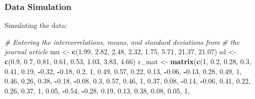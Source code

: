\documentclass[
  11pt,
]{book}
\newenvironment{Shaded}{\begin{snugshade}}{\end{snugshade}}
\newcommand{\CommentTok}[1]{\textcolor[rgb]{0.37,0.37,0.37}{\textit{#1}}}
\newcommand{\DecValTok}[1]{\textcolor[rgb]{0.06,0.06,0.06}{#1}}
\newcommand{\FloatTok}[1]{\textcolor[rgb]{0.06,0.06,0.06}{#1}}
\newcommand{\FunctionTok}[1]{\textcolor[rgb]{0.27,0.27,0.27}{\textbf{#1}}}
\newcommand{\NormalTok}[1]{#1}
\newcommand{\OtherTok}[1]{\textcolor[rgb]{0.37,0.37,0.37}{#1}}
\newcommand{\SpecialCharTok}[1]{\textcolor[rgb]{0.43,0.43,0.43}{\textbf{#1}}}
\begin{document}
\hypertarget{data-simulation-1}{%
\subsubsection{Data Simulation}\label{data-simulation-1}}

Simulating the data:

\begin{Shaded}
\begin{Highlighting}[]
\CommentTok{\# Entering the intercorrelations, means, and standard deviations from}
\CommentTok{\# the journal article}
\NormalTok{mu }\OtherTok{\textless{}{-}} \FunctionTok{c}\NormalTok{(}\FloatTok{1.99}\NormalTok{, }\FloatTok{2.82}\NormalTok{, }\FloatTok{2.48}\NormalTok{, }\FloatTok{2.32}\NormalTok{, }\FloatTok{1.75}\NormalTok{, }\FloatTok{5.71}\NormalTok{, }\FloatTok{21.37}\NormalTok{, }\FloatTok{21.07}\NormalTok{)}
\NormalTok{sd }\OtherTok{\textless{}{-}} \FunctionTok{c}\NormalTok{(}\FloatTok{0.9}\NormalTok{, }\FloatTok{0.7}\NormalTok{, }\FloatTok{0.81}\NormalTok{, }\FloatTok{0.61}\NormalTok{, }\FloatTok{0.53}\NormalTok{, }\FloatTok{1.03}\NormalTok{, }\FloatTok{3.83}\NormalTok{, }\FloatTok{4.66}\NormalTok{)}
\NormalTok{r\_mat }\OtherTok{\textless{}{-}} \FunctionTok{matrix}\NormalTok{(}\FunctionTok{c}\NormalTok{(}\DecValTok{1}\NormalTok{, }\FloatTok{0.2}\NormalTok{, }\FloatTok{0.28}\NormalTok{, }\FloatTok{0.3}\NormalTok{, }\FloatTok{0.41}\NormalTok{, }\FloatTok{0.19}\NormalTok{, }\SpecialCharTok{{-}}\FloatTok{0.32}\NormalTok{, }\SpecialCharTok{{-}}\FloatTok{0.18}\NormalTok{, }\FloatTok{0.2}\NormalTok{, }\DecValTok{1}\NormalTok{,}
    \FloatTok{0.49}\NormalTok{, }\FloatTok{0.57}\NormalTok{, }\FloatTok{0.22}\NormalTok{, }\FloatTok{0.13}\NormalTok{, }\SpecialCharTok{{-}}\FloatTok{0.06}\NormalTok{, }\SpecialCharTok{{-}}\FloatTok{0.13}\NormalTok{, }\FloatTok{0.28}\NormalTok{, }\FloatTok{0.49}\NormalTok{, }\DecValTok{1}\NormalTok{, }\FloatTok{0.46}\NormalTok{, }\FloatTok{0.26}\NormalTok{, }\FloatTok{0.38}\NormalTok{,}
    \SpecialCharTok{{-}}\FloatTok{0.18}\NormalTok{, }\SpecialCharTok{{-}}\FloatTok{0.08}\NormalTok{, }\FloatTok{0.3}\NormalTok{, }\FloatTok{0.57}\NormalTok{, }\FloatTok{0.46}\NormalTok{, }\DecValTok{1}\NormalTok{, }\FloatTok{0.37}\NormalTok{, }\FloatTok{0.08}\NormalTok{, }\SpecialCharTok{{-}}\FloatTok{0.14}\NormalTok{, }\SpecialCharTok{{-}}\FloatTok{0.06}\NormalTok{, }\FloatTok{0.41}\NormalTok{, }\FloatTok{0.22}\NormalTok{,}
    \FloatTok{0.26}\NormalTok{, }\FloatTok{0.37}\NormalTok{, }\DecValTok{1}\NormalTok{, }\FloatTok{0.05}\NormalTok{, }\SpecialCharTok{{-}}\FloatTok{0.54}\NormalTok{, }\SpecialCharTok{{-}}\FloatTok{0.28}\NormalTok{, }\FloatTok{0.19}\NormalTok{, }\FloatTok{0.13}\NormalTok{, }\FloatTok{0.38}\NormalTok{, }\FloatTok{0.08}\NormalTok{, }\FloatTok{0.05}\NormalTok{, }\DecValTok{1}\NormalTok{,}

\end{Highlighting}
\end{Shaded}
\end{document}
